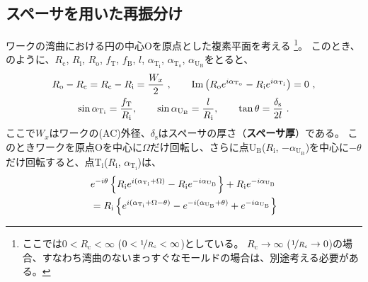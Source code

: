 \subsection{スペーサを用いた再振分け}
ワークの湾曲における円の中心Oを原点とした複素平面を考える
\footnote{ここでは$0 < R_\mathrm c < \infty$ ($0 < \nicefrac1{R_\mathrm c} < \infty$)としている。
$R_\mathrm c \to \infty$ ($\nicefrac1{R_\mathrm c} \to 0$)の場合、すなわち湾曲のないまっすぐなモールドの場合は、別途考える必要がある。}。
このとき、のように、$R_\mathrm c$, $R_\mathrm i$, $R_\mathrm o$, $f_\mathrm T$, $f_\mathrm B$, $l$, $\alpha_{\mathrm T_\mathrm i}$, $\alpha_{\mathrm T_\mathrm o}$, $\alpha_{\mathrm U_\mathrm B}$をとると、
\begin{subequations}
\begin{gather}
  \label{eq:constraintUpoint1}
  R_\mathrm o - R_\mathrm c = R_\mathrm c - R_\mathrm i = \frac{W_x}2~, \qquad
  \operatorname{Im}\left(R_\mathrm oe^{i\alpha_{\mathrm T_\mathrm o}} - R_\mathrm ie^{i\alpha_{\mathrm T_\mathrm i}}\right)
  = 0~,\\
  \label{eq:constraintUpoint2}
  \sin\alpha_{\mathrm T_\mathrm i} = \frac{f_\mathrm T}{R_\mathrm i}, \qquad
  \sin\alpha_{\mathrm U_\mathrm B} = \frac l{R_\mathrm i}, \qquad
  \tan\theta = \frac{\delta_\mathrm s}{2l}~.
\end{gather}
\end{subequations}
ここで$W_x$はワークの(AC)外径、$\delta_\mathrm s$はスペーサの厚さ（\textbf{スペーサ厚}）である。
このときワークを原点Oを中心に$\Omega$だけ回転し、さらに点U$_\mathrm B$($R_\mathrm i$, $-\alpha_{\mathrm U_\mathrm B}$)を中心に$-\theta$だけ回転すると、点T$_\mathrm i$($R_\mathrm i$, $\alpha_{\mathrm T_\mathrm i}$)は、
\begin{align}
  \notag
  & e^{-i\theta}\left\{R_\mathrm ie^{i(\alpha_{\mathrm T_\mathrm i} + \Omega)} - R_\mathrm ie^{-i\alpha_{\mathrm U_\mathrm B}}\right\}
    +R_\mathrm ie^{-i\alpha_{\mathrm U_\mathrm B}}\\
  &= R_\mathrm i
     \left\{
       e^{i(\alpha_{\mathrm T_\mathrm i} + \Omega - \theta)} - e^{-i(\alpha_{\mathrm U_\mathrm B} + \theta)} + e^{-i\alpha_{\mathrm U_\mathrm B}}
     \right\}
  \label{eq:afterftUpoint}
\end{align}

